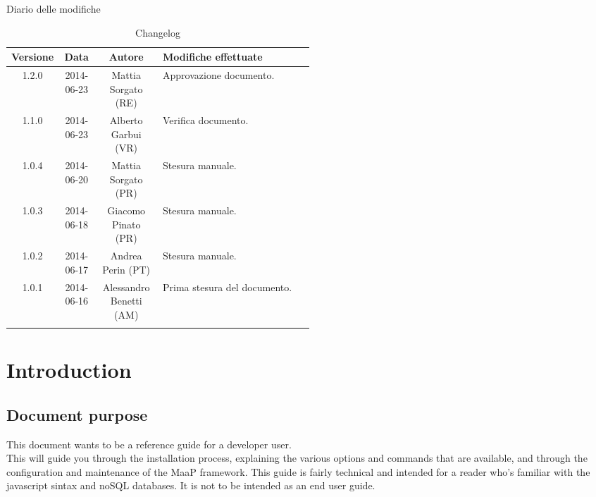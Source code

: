 
\newpage
Diario delle modifiche
\begin{center}
\begin{longtable}{|c|c|c|p{0.5\linewidth}|}
\toprule
\textbf{Versione} & \textbf{Data} & \textbf{Autore} & \textbf{Modifiche effettuate}\\

\midrule
1.2.0 & 2014-06-23 & Mattia Sorgato (RE) & Approvazione documento.\\
\midrule
1.1.0 & 2014-06-23 & Alberto Garbui (VR) & Verifica documento.\\
\midrule
1.0.4 & 2014-06-20 & Mattia Sorgato (PR) & Stesura manuale.\\
\midrule
1.0.3 & 2014-06-18 & Giacomo Pinato (PR) & Stesura manuale.\\
\midrule
1.0.2 & 2014-06-17 & Andrea Perin (PT) & Stesura manuale.\\
\midrule
1.0.1 & 2014-06-16 & Alessandro Benetti (AM) & Prima stesura del documento.\\

\bottomrule
\caption{Changelog}
\label{tab:changelog}

\end{longtable}
\end{center}

\newpage
\tableofcontents

\newpage

\newpage
\section{Introduction}
\subsection{Document purpose}
This document wants to be a reference guide for a developer user. \\
This will guide you through the installation process, explaining the various options and commands that are available, and through the configuration and maintenance of the MaaP framework.
This guide is fairly technical and intended for a reader who's familiar with the javascript sintax and noSQL databases.
It is not to be intended as an end user guide.

